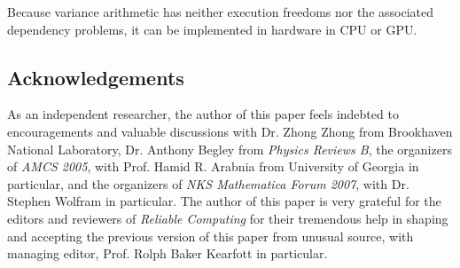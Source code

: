 \documentclass[twoside]{article}
\numberwithin{equation}{section}
\begin{document}
Because variance arithmetic has neither execution freedoms nor the associated dependency problems, it can be implemented in hardware in CPU or GPU.



\subsection{Acknowledgements}

As an independent researcher, the author of this paper feels indebted to encouragements and valuable discussions with Dr. Zhong Zhong from Brookhaven National Laboratory, Dr. Anthony Begley from \emph{Physics Reviews B}, the organizers of \emph{AMCS 2005}, with Prof. Hamid R. Arabnia from University of Georgia in particular, and the organizers of \emph{NKS Mathematica Forum 2007}, with Dr. Stephen Wolfram in particular. 
The author of this paper is very grateful for the editors and reviewers of \emph{Reliable Computing} for their tremendous help in shaping and accepting the previous version of this paper from unusual source, with managing editor, Prof. Rolph Baker Kearfott in particular.





\end{document}
